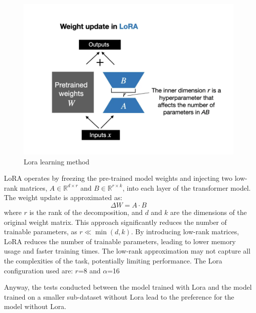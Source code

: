\begin{figure}[H]
    \centering
    \includegraphics[width=0.5\linewidth]{img/Lora.png}
    \caption{Lora learning method}
    \label{fig:Lora}
\end{figure}
LoRA operates by freezing the pre-trained model weights and injecting 
two low-rank matrices, \( A \in \mathbb{R}^{d \times r} \) and 
\( B \in \mathbb{R}^{r \times k} \), into each layer of the 
transformer model. The weight update is approximated as:
\[
\Delta W = A \cdot B
\]
where \( r \) is the rank of the decomposition, and \( d \) 
and \( k \) are the dimensions of the original weight matrix. 
This approach significantly reduces the number of trainable parameters, 
as \( r \ll \min(d, k) \).
By introducing low-rank matrices, LoRA reduces the number of trainable 
parameters, leading to lower memory usage and faster training times.
The low-rank approximation may not capture all the complexities of the task, 
potentially limiting performance.
The Lora configuration used are: $r$=8 and $\alpha$=16


Anyway, the tests conducted between the model trained with 
Lora and the model trained on a smaller sub-dataset without 
Lora lead to the preference for the model without Lora.


